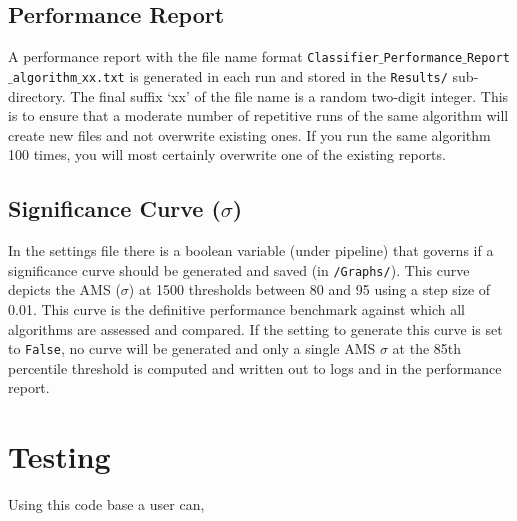\documentclass[a4paper,twoside]{article}
\begin{document}
\subsection{Performance Report}
A performance report with the file name format \texttt{Classifier$\_$Performance$\_$Report$\_$algorithm$\_$xx.txt} is generated in each run and stored in the \texttt{Results/} sub-directory. The final suffix `xx' of the file name is a random two-digit integer. This is to ensure that a moderate number of repetitive runs of the same algorithm will create new files and not overwrite existing ones. If you run the same algorithm 100 times, you will most certainly overwrite one of the existing reports.  

\subsection{Significance Curve ($\sigma$)}
In the settings file there is a boolean variable (under pipeline) that governs if a significance curve should be generated and saved (in \texttt{/Graphs/}). This curve depicts the AMS ($\sigma$) at 1500 thresholds between 80 and 95 using a step size of 0.01. This curve is the definitive performance benchmark against which all algorithms are assessed and compared. If the setting to generate this curve is set to \texttt{False}, no curve will be generated and only a single AMS $\sigma$ at the 85th percentile threshold is computed and written out to logs and in the performance report. 
  
\section{Testing}

Using this code base a user can, 
\end{document}
